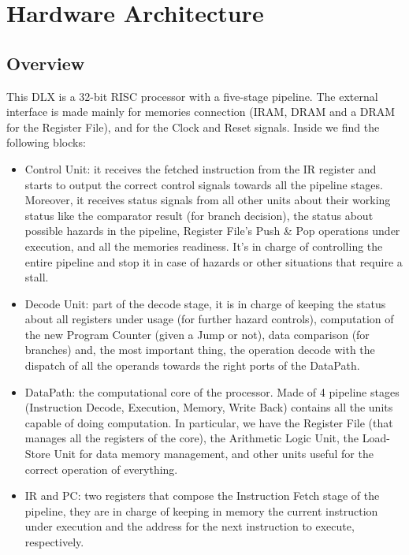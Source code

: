 \chapter{Hardware Architecture}

\section{Overview}

This DLX is a 32-bit RISC processor with a five-stage pipeline. The external interface is made mainly for memories connection (IRAM, DRAM and a DRAM for the Register File), and for the Clock and Reset signals. Inside we find the following blocks:

\begin{itemize}
    \item Control Unit: it receives the fetched instruction from the IR register and starts to output the correct control signals towards all the pipeline stages. Moreover, it receives status signals from all other units about their working status like the comparator result (for branch decision), the status about possible hazards in the pipeline, Register File's Push \& Pop operations under execution, and all the memories readiness. It's in charge of controlling the entire pipeline and stop it in case of hazards or other situations that require a stall.
    \item Decode Unit: part of the decode stage, it is in charge of keeping the status about all registers under usage (for further hazard controls), computation of the new Program Counter (given a Jump or not), data comparison (for branches) and, the most important thing, the operation decode with the dispatch of all the operands towards the right ports of the DataPath.
    \item DataPath: the computational core of the processor. Made of 4 pipeline stages (Instruction Decode, Execution, Memory, Write Back) contains all the units capable of doing computation. In particular, we have the Register File (that manages all the registers of the core), the Arithmetic Logic Unit, the Load-Store Unit for data memory management, and other units useful for the correct operation of everything.
    \item IR and PC: two registers that compose the Instruction Fetch stage of the pipeline, they are in charge of keeping in memory the current instruction under execution and the address for the next instruction to execute, respectively. 
\end{itemize}


